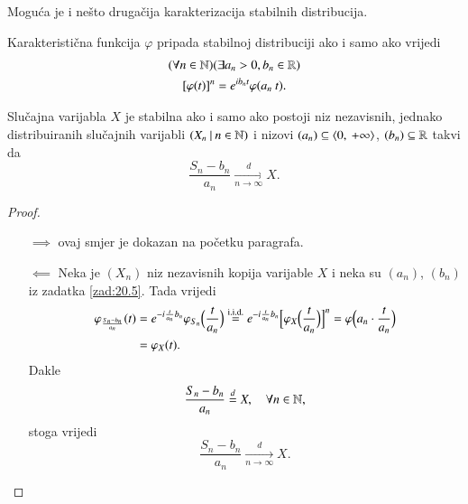 Mogu\' ca je i ne\v sto druga\v cija karakterizacija stabilnih distribucija.

\begin{zad}[*]  \label{zad:20.5}
    Karakteristi\v cna funkcija $\varphi$ pripada stabilnoj distribuciji ako i samo ako vrijedi
    \begin{equation*}
        \begin{gathered}
            (\forall n \in \mathbb{N}) (\exists a_n > 0, b_n \in \mathbb{R})\\
            [\varphi (t)]^n = e^{ib_n t} \varphi (a_n \: t).
        \end{gathered}
    \end{equation*}
\end{zad}

\begin{tm}  \label{tm:20.6}
    Slu\v cajna varijabla $X$ je stabilna ako i samo ako postoji niz nezavisnih, jednako distribuiranih slu\v cajnih varijabli $({X_n} \: | \: {n \in \mathbb{N}})$ i nizovi $(a_n) \subseteq \langle {0}, \: {+\infty} \rangle$, $(b_n) \subseteq \mathbb{R}$ takvi da
    \begin{equation*}
        \frac{S_n - b_n}{a_n} \xrightarrow[n \to \infty]{d} X.
    \end{equation*}
\end{tm}

\begin{proof}
    \quad
    \begin{enumerate}
        \item[$\implies$]
        ovaj smjer je dokazan na po\v cetku paragrafa.
        \item[$\impliedby$]
        Neka je $(X_n)$ niz nezavisnih kopija varijable $X$ i neka su $(a_n)$, $(b_n)$ iz zadatka \ref{zad:20.5}.
        Tada vrijedi
        \begin{equation*}
            \begin{aligned}
                \varphi_{\frac{S_n - b_n}{a_n}} (t) &= e^{-i\frac{t}{a_n} b_n} \varphi_{S_n} \Big( \frac{t}{a_n} \Big) \overset{\mathrm{i.i.d.}}{=} e^{-i \frac{t}{a_n} b_n} \Big[ \varphi_X \Big( \frac{t}{a_n} \Big)  \Big]^n = \varphi \Big( a_n \cdot \frac{t}{a_n} \Big)\\
                &= \varphi_X (t).
            \end{aligned}
        \end{equation*}
        Dakle
        \begin{equation*}
            \frac{S_n - b_n}{a_n} \overset{d}{=} X, \quad \forall n \in \mathbb{N},    
        \end{equation*}
        stoga vrijedi
        \begin{equation*}
            \frac{S_n - b_n}{a_n} \xrightarrow[n \to \infty]{d} X.
        \end{equation*}
    \end{enumerate}
\end{proof}

